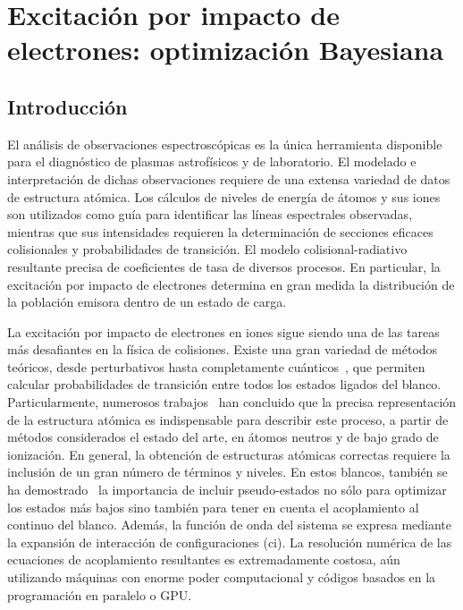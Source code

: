 \chapter{Excitación por impacto de electrones: optimización Bayesiana}
\label{chap:bayeopt}

\begin{comment}

\end{comment}

\section{Introducción}
\label{sec:intro}

El análisis de observaciones espectroscópicas es la única herramienta 
disponible para el diagnóstico de plasmas astrofísicos y de laboratorio. 
El modelado e interpretación de dichas observaciones requiere de una 
extensa variedad de datos de estructura atómica. Los cálculos de niveles 
de energía de átomos y sus iones son utilizados como guía para 
identificar las líneas espectrales observadas, mientras que sus 
intensidades requieren la determinación de secciones eficaces 
colisionales y probabilidades de transición. El modelo 
colisional-radiativo resultante precisa de coeficientes de tasa de 
diversos procesos. En particular, la excitación por impacto de 
electrones determina en gran medida la distribución de la población 
emisora dentro de un estado de carga. 

La excitación por impacto de electrones en iones sigue siendo una de las 
tareas más desafiantes en la física de colisiones. Existe una gran 
variedad de métodos teóricos, desde perturbativos hasta completamente 
cuánticos~\cite{Pindzola:07,Burke:11,Bray:17,Zatsarinny:04}, que 
permiten calcular probabilidades de transición entre todos los estados 
ligados del blanco. Particularmente, numerosos 
trabajos~\cite{Bartschat:04,Zatsarinny:16,Be_Ballance:03} han concluido 
que la precisa representación de la estructura atómica es indispensable 
para describir este proceso, a partir de métodos considerados el estado 
del arte, en átomos neutros y de bajo grado de ionización. 
En general, la obtención de estructuras atómicas correctas requiere la 
inclusión de un gran número de términos y niveles. 
En estos blancos, también se ha demostrado~\cite{Ballance:03,Badnell:03,
Mitnik:03} la importancia de incluir pseudo-estados no sólo para 
optimizar los estados más bajos sino también para tener en cuenta el 
acoplamiento al continuo del blanco. 
Además, la función de onda del sistema se expresa mediante la expansión 
de interacción de configuraciones (\acs{ci}). 
La resolución numérica de las ecuaciones de acoplamiento resultantes es 
extremadamente costosa, aún utilizando máquinas con enorme poder 
computacional y códigos basados en la programación en paralelo o GPU. 

